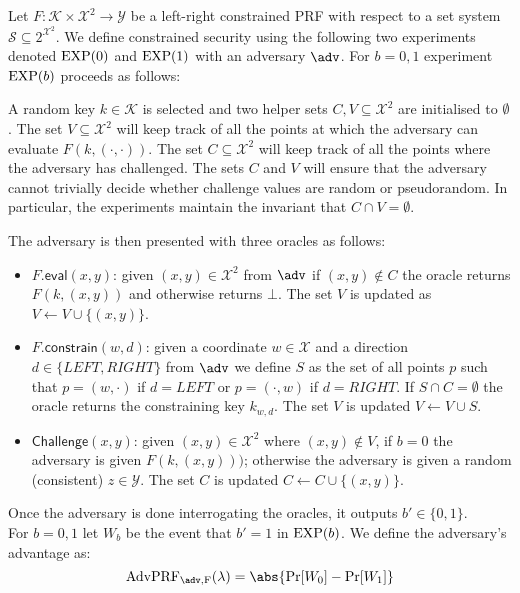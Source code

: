 		\begin{secgame} \label{att:lrPRF}
		Let $F: \mathcal{K} \times \mathcal{X}^2 \rightarrow \mathcal{Y}$ be a left-right constrained PRF with respect to a set system $\mathcal{S} \subseteq 2^{\mathcal{X}^2}$. We define constrained security using the following two experiments denoted $\mathrm{EXP}({0})$ and $\mathrm{EXP}({1})$ with an adversary $\adv$. For $b=0,1$ experiment $\mathrm{EXP}({b})$ proceeds as follows:

			A random key $k \in \mathcal{K}$ is selected and two helper sets $C,V \subseteq \mathcal{X}^2$ are initialised to $\emptyset$. The set $V \subseteq \mathcal{X}^2$ will keep track of all the points at which the adversary can evaluate $F(k, (\cdot,\cdot))$. The set $C \subseteq \mathcal{X}^2$ will keep track of all the points where the adversary has challenged. The sets $C$ and $V$ will ensure that the adversary cannot trivially decide whether challenge values are random or pseudorandom. In particular, the experiments maintain the invariant that $C \cap V = \emptyset$.

The adversary is then presented with three oracles as follows:

\begin{itemize}
	\item $F.\mathsf{eval}(x,y)$: given $(x,y) \in \mathcal{X}^2$ from $\adv$ if $(x,y) \notin C$ the oracle returns $F(k, (x,y))$ and otherwise returns $\bot$. The set $V$ is updated as $V\leftarrow V \cup \{(x,y)\}$.
	\item $F.\mathsf{constrain}(w,d)$: given a coordinate $w \in \mathcal{X}$ and a direction $d \in \{LEFT,RIGHT\}$ from $\adv$ we define $S$ as the set of all points $p$ such that $p = (w, \cdot)$ if $d=LEFT$ or $p = (\cdot, w)$ if $d=RIGHT$. If $S\cap C= \emptyset$ the oracle returns the constraining key $k_{w, d}$. The set $V$ is updated $V\leftarrow V \cup S$.
	\item $\mathsf{Challenge}(x,y)$: given $(x,y)\in \mathcal{X}^2$ where $(x,y) \notin V$, if $b=0$ the adversary is given $F(k, (x,y)))$; otherwise the adversary is given a random (consistent) $z \in \mathcal{Y}$. The set $C$ is updated $C \leftarrow C \cup \{(x,y)\}$.
\end{itemize}
			Once the adversary is done interrogating the oracles, it outputs $b' \in \{0,1\}$.\\
			
			\noindent For $b = 0,1$ let $W_b$ be the event that $b'=1$ in $\mathrm{EXP}({b})$. We define the adversary's advantage as: \begin{equation} \label{eq:advLRPRF}
				\mathrm{AdvPRF_{\adv, F}}(\lambda) = \abs{\mathrm{Pr}[W_0] - \mathrm{Pr}[W_1]}
			\end{equation}
		\end{secgame}
		
